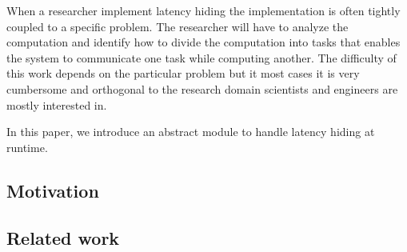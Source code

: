 \documentclass[preprint]{../PGAS10/sigplanconf}
\begin{document}
When a researcher implement latency hiding the implementation is often tightly coupled to a specific problem. The researcher will have to analyze the computation and identify how to divide the computation into tasks that enables the system to communicate one task while computing another. The difficulty of this work depends on the particular problem but it most cases it is very cumbersome and orthogonal to the research domain scientists and engineers are mostly interested in.

In this paper, we introduce an abstract module to handle latency hiding at runtime.



\subsection{Motivation}
\subsection{Related work}
\end{document}
